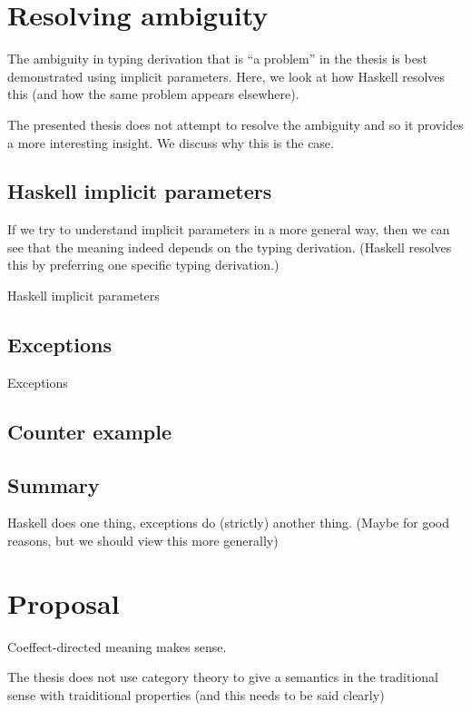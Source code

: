 \documentclass[
		twoside,openright,titlepage,numbers=noenddot,headinclude,%
                footinclude=true,cleardoublepage=empty,
                BCOR=10mm,paper=a4,fontsize=10pt, %
                ngerman,american, %
                ]{scrreprt}
\begin{document}
\section{Resolving ambiguity}
\label{sec:ambiguity}

The ambiguity in typing derivation that is ``a problem'' in the thesis is best demonstrated
using implicit parameters. Here, we look at how Haskell resolves this (and how the same
problem appears elsewhere).

The presented thesis does not attempt to resolve the ambiguity and so it provides a more
interesting insight. We discuss why this is the case.

\subsection{Haskell implicit parameters}

If we try to understand implicit parameters in a more general way, then we can see that the meaning
indeed depends on the typing derivation. (Haskell resolves this by preferring one specific typing derivation.)


Haskell implicit parameters

\subsection{Exceptions}
Exceptions

\subsection{Counter example}


\subsection{Summary}

Haskell does one thing, exceptions do (strictly) another thing.
(Maybe for good reasons, but we should view this more generally)

\section{Proposal}
\label{sec:proposal}

Coeffect-directed meaning makes sense.

The thesis does not use category theory to give a semantics in the traditional sense with
traiditional properties (and this needs to be said clearly)
\end{document}
